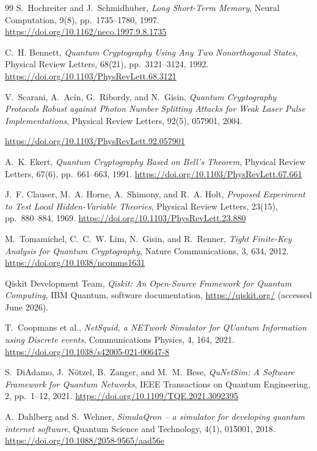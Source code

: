 \documentclass[12pt, a4paper]{article}
\begin{document}
\begin{thebibliography}{99}
    S.~Hochreiter and J.~Schmidhuber,
    \textit{Long Short-Term Memory},
    Neural Computation, 9(8), pp.~1735--1780, 1997.
    \url{https://doi.org/10.1162/neco.1997.9.8.1735}

    C.~H. Bennett,
    \textit{Quantum Cryptography Using Any Two Nonorthogonal States},
    Physical Review Letters, 68(21), pp.~3121--3124, 1992.
    \url{https://doi.org/10.1103/PhysRevLett.68.3121}

    V.~Scarani, A.~Ac\'{i}n, G.~Ribordy, and N.~Gisin,
    \textit{Quantum Cryptography Protocols Robust against Photon
    Number Splitting Attacks for Weak Laser Pulse Implementations},
    Physical Review Letters, 92(5), 057901, 2004.
    
    \url{https://doi.org/10.1103/PhysRevLett.92.057901}

    A.~K. Ekert,
    \textit{Quantum Cryptography Based on Bell's Theorem},
    Physical Review Letters, 67(6), pp.~661--663, 1991.
    \url{https://doi.org/10.1103/PhysRevLett.67.661}

    J.~F. Clauser, M.~A. Horne, A.~Shimony, and R.~A. Holt,
    \textit{Proposed Experiment to Test Local Hidden-Variable
    Theories},
    Physical Review Letters, 23(15), pp.~880--884, 1969.
    \url{https://doi.org/10.1103/PhysRevLett.23.880}

    M.~Tomamichel, C.~C.~W. Lim, N.~Gisin, and R.~Renner,
    \textit{Tight Finite-Key Analysis for Quantum Cryptography},
    Nature Communications, 3, 634, 2012.
    \url{https://doi.org/10.1038/ncomms1631}

    Qiskit Development Team,
    \textit{Qiskit: An Open-Source Framework for Quantum Computing},
    IBM Quantum, software documentation,
    \url{https://qiskit.org/} (accessed June 2026).

    T.~Coopmans et al.,
    \textit{NetSquid, a NETwork Simulator for QUantum Information
    using Discrete events},
    Communications Physics, 4, 164, 2021.
    \url{https://doi.org/10.1038/s42005-021-00647-8}

    S.~DiAdamo, J.~N\"otzel, B.~Zanger, and M.~M.~Bese,
    \textit{QuNetSim: A Software Framework for Quantum Networks},
    IEEE Transactions on Quantum Engineering, 2, pp.~1--12, 2021.
    \url{https://doi.org/10.1109/TQE.2021.3092395}

    A.~Dahlberg and S.~Wehner,
    \textit{SimulaQron -- a simulator for developing quantum internet
    software},
    Quantum Science and Technology, 4(1), 015001, 2018.
    \url{https://doi.org/10.1088/2058-9565/aad56e}

\end{thebibliography}
\end{document}
